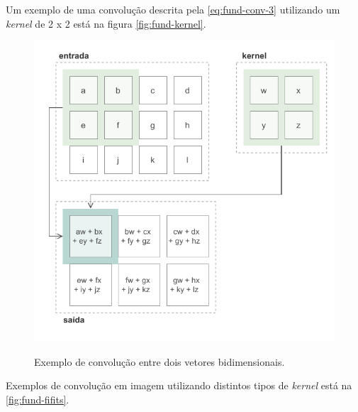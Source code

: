 Um exemplo de uma convolução descrita pela \autoref{eq:fund-conv-3} utilizando um \textit{kernel} de 2 x 2 está na figura \autoref{fig:fund-kernel}.

\begin{figure}[h!] %
  \centering
  \caption{Exemplo de convolução entre dois vetores bidimensionais.}
  \includegraphics[scale=1.1]{img/img-fundamentacao-kernel.pdf}
  \label{fig:fund-kernel}
\end{figure}

Exemplos de convolução em imagem utilizando distintos tipos de \textit{kernel} está na \autoref{fig:fund-fifits}.

